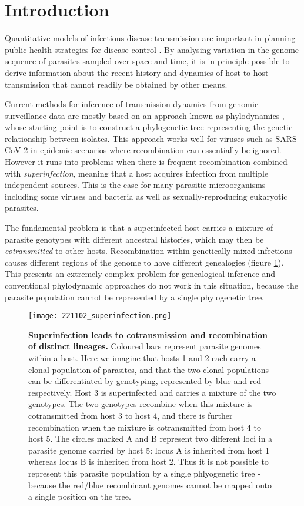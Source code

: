 \documentclass[_main.tex]{subfiles}
\begin{document}
\section*{Introduction}

Quantitative models of infectious disease transmission are important in planning public health strategies for disease control \cite{Ross1915,Smith2012}.  By analysing variation in the genome sequence of parasites sampled over space and time, it is in principle possible to derive information about the recent history and dynamics of host to host transmission that cannot readily be obtained by other means.

Current methods for inference of transmission dynamics from genomic surveillance data are mostly based on an approach known as phylodynamics \cite{Grenfell2004,Volz2013}, whose starting point is to construct a phylogenetic tree representing the genetic relationship between isolates.  This approach works well for viruses such as SARS-CoV-2 in epidemic scenarios where recombination can essentially be ignored.  However it runs into problems when there is frequent recombination combined with \textit{superinfection}, meaning that a host acquires infection from multiple independent sources.  This is the case for many parasitic microorganisms including some viruses and bacteria as well as sexually-reproducing eukaryotic parasites.

The fundamental problem is that a superinfected host carries a mixture of parasite genotypes with different ancestral histories, which may then be \textit{cotransmitted} to other hosts.  Recombination within genetically mixed infections causes different regions of the genome to have different genealogies (figure \ref{fig:superinfection1}).  This presents an extremely complex problem for genealogical inference  \cite{Speidel2019, Kelleher2019} and conventional phylodynamic approaches do not work in this situation, because the parasite population cannot be represented by a single phylogenetic tree.

\begin{figure}[h!]
\centering
\texttt{[image: 221102\_superinfection.png]}
\caption{\textbf{Superinfection leads to cotransmission and recombination of distinct lineages.}  Coloured bars represent parasite genomes within a host.  Here we imagine that hosts 1 and 2 each carry a clonal population of parasites, and that the two clonal populations can be differentiated by genotyping, represented by blue and red respectively.  Host 3 is superinfected and carries a mixture of the two genotypes.  The two genotypes recombine when this mixture is cotransmitted from host 3 to host 4, and there is further recombination when the mixture is cotransmitted from host 4 to host 5.  The circles marked A and B represent two different loci in a parasite genome carried by host 5: locus A is inherited from host 1 whereas locus B is inherited from host 2.  Thus it is not possible to represent this parasite population by a single phlyogenetic tree - because the red/blue recombinant genomes cannot be mapped onto a single position on the tree.}
\label{fig:superinfection1}
\end{figure}
\end{document}
